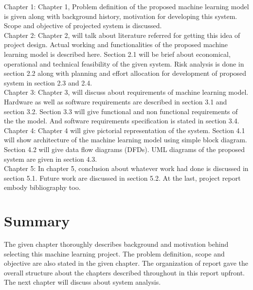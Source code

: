 Chapter 1: Chapter 1, Problem definition of the proposed machine learning model is given along with background history, motivation for developing this system. Scope and objective of projected system is discussed.\\ 
Chapter 2: Chapter 2, will talk about literature referred for getting this idea of project design. Actual working and functionalities of the proposed machine learning model is described here. Section 2.1 will be brief about economical, operational and technical feasibility of the given system. Risk analysis is done in section 2.2 along with planning and effort allocation for development of proposed system in section 2.3 and 2.4.\\
Chapter 3: Chapter 3, will discuss about requirements of machine learning model. Hardware as well as software requirements are described in section 3.1 and section 3.2. Section 3.3 will give functional and non functional requirements of the the model. And software requirements specification is stated in section 3.4.\\
Chapter 4: Chapter 4 will give pictorial representation of the system. Section 4.1 will show architecture of the machine learning model using simple block diagram. Section 4.2 will give data flow diagrams (DFDs). UML diagrams of the proposed system are given in section 4.3.\\
Chapter 5: In chapter 5, conclusion about whatever work had done is discussed in section 5.1. Future work are discussed in section 5.2. At the last, project report embody bibliography too.


\section{Summary}
The given chapter thoroughly describes background and motivation behind selecting this machine learning project. The problem definition, scope and objective are also stated in the given chapter. The organization of report gave the overall structure about the chapters described throughout in this report upfront. The next chapter will discuss about system analysis.
